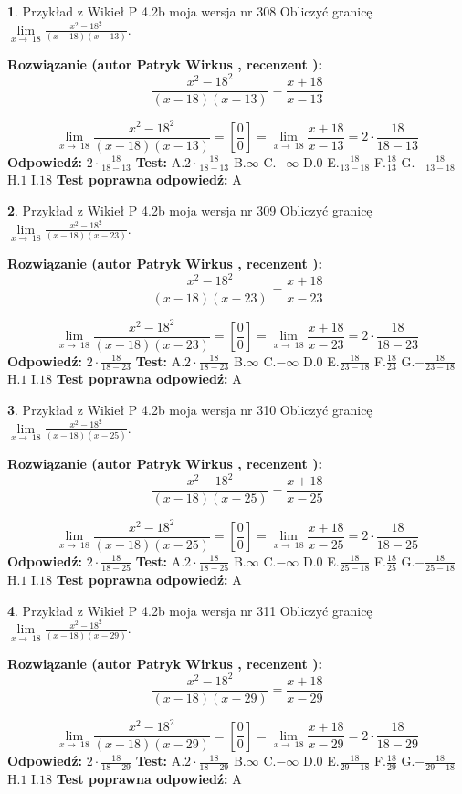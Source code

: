 \documentclass[12pt, a4paper]{article}
\theoremstyle{definition} %
\newtheorem{zad}{}
\newcommand{\zadStart}[1]{\begin{zad}#1\newline}
\newcommand{\zadStop}{\end{zad}}
\newcommand{\rozwStart}[2]{\noindent \textbf{Rozwiązanie (autor #1 , recenzent #2): }\newline}
\newcommand{\rozwStop}{\newline}
\newcommand{\odpStart}{\noindent \textbf{Odpowiedź:}\newline}
\newcommand{\odpStop}{\newline}
\newcommand{\testStart}{\noindent \textbf{Test:}\newline}
\newcommand{\testStop}{\newline}
\newcommand{\kluczStart}{\noindent \textbf{Test poprawna odpowiedź:}\newline}
\newcommand{\kluczStop}{\newline}
\begin{document}
\zadStart{Przykład z Wikieł P 4.2b moja wersja nr 308}
Obliczyć granicę $\lim\limits_{x\to\ 18}\frac{x^{2}-18^{2}}{(x-18)(x-13)}$.
\zadStop
\rozwStart{Patryk Wirkus}{}
$$\frac{x^{2}-18^{2}}{(x-18)(x-13)}=\frac{x+18}{x-13}$$

$$\lim\limits_{x\to\ 18}\frac{x^{2}-18^{2}}{(x-18)(x-13)}=[\frac{0}{0}]=\lim\limits_{x\to\ 18}\frac{x+18}{x-13}=2 \cdot \frac{18}{18-13}$$
\rozwStop
\odpStart
$2 \cdot \frac{18}{18-13}$
\odpStop
\testStart
A.$2 \cdot \frac{18}{18-13}$
B.$\infty$
C.$-\infty$
D.$0$
E.$\frac{18}{13-18}$
F.$\frac{18}{13}$
G.$-\frac{18}{13-18}$
H.$1$
I.$18$
\testStop
\kluczStart
A
\kluczStop



\zadStart{Przykład z Wikieł P 4.2b moja wersja nr 309}
Obliczyć granicę $\lim\limits_{x\to\ 18}\frac{x^{2}-18^{2}}{(x-18)(x-23)}$.
\zadStop
\rozwStart{Patryk Wirkus}{}
$$\frac{x^{2}-18^{2}}{(x-18)(x-23)}=\frac{x+18}{x-23}$$

$$\lim\limits_{x\to\ 18}\frac{x^{2}-18^{2}}{(x-18)(x-23)}=[\frac{0}{0}]=\lim\limits_{x\to\ 18}\frac{x+18}{x-23}=2 \cdot \frac{18}{18-23}$$
\rozwStop
\odpStart
$2 \cdot \frac{18}{18-23}$
\odpStop
\testStart
A.$2 \cdot \frac{18}{18-23}$
B.$\infty$
C.$-\infty$
D.$0$
E.$\frac{18}{23-18}$
F.$\frac{18}{23}$
G.$-\frac{18}{23-18}$
H.$1$
I.$18$
\testStop
\kluczStart
A
\kluczStop



\zadStart{Przykład z Wikieł P 4.2b moja wersja nr 310}
Obliczyć granicę $\lim\limits_{x\to\ 18}\frac{x^{2}-18^{2}}{(x-18)(x-25)}$.
\zadStop
\rozwStart{Patryk Wirkus}{}
$$\frac{x^{2}-18^{2}}{(x-18)(x-25)}=\frac{x+18}{x-25}$$

$$\lim\limits_{x\to\ 18}\frac{x^{2}-18^{2}}{(x-18)(x-25)}=[\frac{0}{0}]=\lim\limits_{x\to\ 18}\frac{x+18}{x-25}=2 \cdot \frac{18}{18-25}$$
\rozwStop
\odpStart
$2 \cdot \frac{18}{18-25}$
\odpStop
\testStart
A.$2 \cdot \frac{18}{18-25}$
B.$\infty$
C.$-\infty$
D.$0$
E.$\frac{18}{25-18}$
F.$\frac{18}{25}$
G.$-\frac{18}{25-18}$
H.$1$
I.$18$
\testStop
\kluczStart
A
\kluczStop



\zadStart{Przykład z Wikieł P 4.2b moja wersja nr 311}
Obliczyć granicę $\lim\limits_{x\to\ 18}\frac{x^{2}-18^{2}}{(x-18)(x-29)}$.
\zadStop
\rozwStart{Patryk Wirkus}{}
$$\frac{x^{2}-18^{2}}{(x-18)(x-29)}=\frac{x+18}{x-29}$$

$$\lim\limits_{x\to\ 18}\frac{x^{2}-18^{2}}{(x-18)(x-29)}=[\frac{0}{0}]=\lim\limits_{x\to\ 18}\frac{x+18}{x-29}=2 \cdot \frac{18}{18-29}$$
\rozwStop
\odpStart
$2 \cdot \frac{18}{18-29}$
\odpStop
\testStart
A.$2 \cdot \frac{18}{18-29}$
B.$\infty$
C.$-\infty$
D.$0$
E.$\frac{18}{29-18}$
F.$\frac{18}{29}$
G.$-\frac{18}{29-18}$
H.$1$
I.$18$
\testStop
\kluczStart
A
\kluczStop
\end{document}
